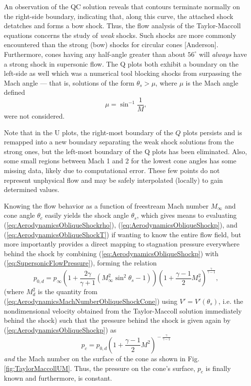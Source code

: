 \documentclass[11pt,dvipsnames]{thesis}
\begin{document}
An observation of the QC solution reveals that contours terminate normally on the right-side boundary, indicating that, along this curve, the attached shock detatches and forms a bow shock. Thus, the flow analysis of the Taylor-Maccoll equations concerns the study of \textit{weak} shocks. Such shocks are more commonly encountered than the strong (bow) shocks for circular cones [Anderson]. 
Furthermore, cones having any half-angle greater than about $56^\circ$ will \textit{always} have a strong shock in supersonic flow.
The Q plots both exhibit a boundary on the left-side as well which was a numerical tool blocking shocks from surpassing the Mach angle --- that is, solutions of the form $\theta_s > \mu$, where $\mu$ is the Mach angle defined
\begin{equation}
\mu = \sin^{-1}\frac{1}{M},
\end{equation}
were not considered.

Note that in the U plots, the right-most boundary of the $Q$ plots persists and is remapped into a new boundary separating the weak shock solutions from the strong ones, but the left-most boundary of the Q plots has been eliminated. Also, some small regions between Mach 1 and 2 for the lowest cone angles has some missing data, likely due to computational error. These few points do not represent unphysical flow and may be safely interpolated (locally) to gain determined values.

Knowing the flow behavior as a function of freestream Mach number $M_\infty$ and cone angle $\theta_c$ easily yields the shock angle $\theta_s$, which gives means to evaluating (\ref{eq:AerodynamicsObliqueShockrho}), (\ref{eq:AerodynamicsObliqueShockp}), and (\ref{eq:AerodynamicsObliqueShockT}) if wanting to know the entire flow field, but more importantly provides a direct mapping to stagnation pressure everywhere behind the shock by combining (\ref{eq:AerodynamicsObliqueShockp}) with (\ref{eq:SupersonicFlowPressure}), forming the relation
\begin{equation}
p_{0,d} = p_\infty\left(1 + \frac{2\gamma}{\gamma + 1}(M_\infty^2 \sin^2\theta_s - 1)\right)\left(1 + \frac{\gamma - 1}{2} M_d^2\right)^{\!\frac{\gamma}{\gamma - 1}},
\end{equation}
(where $M_d^2$ is the quantity from (\ref{eq:AerodynamicsMachNumberObliqueShockCone}) using $V' = V'(\theta_s)$, i.e. the nondimensional velocity obtained from the Taylor-Maccoll solution immediately behind the shock) such that the pressure behind the shock is given again by (\ref{eq:AerodynamicsObliqueShockp}) as
\begin{equation}
p_c = p_{0,d}\left(1 + \frac{\gamma - 1}{2} M^2\right)^{\!-\frac{\gamma}{\gamma - 1}}
\end{equation}
\textit{and} the Mach number on the surface of the cone as shown in Fig. \ref{fig:TaylorMaccollUM}. Thus, the pressure on the cone's surface, $p_c$ is finally known and furthermore, is constant.
\end{document}
